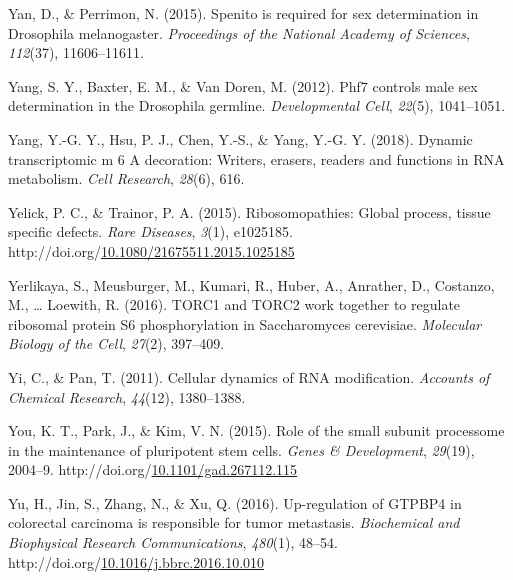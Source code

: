 \documentclass[12pt,oneside]{reedthesis}
\newlength{\cslhangindent}
\newenvironment{CSLReferences}[2] %
 {%
  \setlength{\parindent}{0pt}
  \ifodd #1 \everypar{\setlength{\hangindent}{\cslhangindent}}\ignorespaces\fi
  \ifnum #2 > 0
  \setlength{\parskip}{#2\baselineskip}
  \fi
 }%
 {}
\begin{document}
\begin{CSLReferences}{1}{0}
\leavevmode{}%
Yan, D., \& Perrimon, N. (2015). Spenito is required for sex determination in {Drosophila} melanogaster. \emph{Proceedings of the National Academy of Sciences}, \emph{112}(37), 11606--11611.

\leavevmode{}%
Yang, S. Y., Baxter, E. M., \& Van Doren, M. (2012). Phf7 controls male sex determination in the {Drosophila} germline. \emph{Developmental Cell}, \emph{22}(5), 1041--1051.

\leavevmode{}%
Yang, Y.-G. Y., Hsu, P. J., Chen, Y.-S., \& Yang, Y.-G. Y. (2018). Dynamic transcriptomic m 6 {A} decoration: Writers, erasers, readers and functions in {RNA} metabolism. \emph{Cell Research}, \emph{28}(6), 616.

\leavevmode{}%
Yelick, P. C., \& Trainor, P. A. (2015). Ribosomopathies: {Global} process, tissue specific defects. \emph{Rare Diseases}, \emph{3}(1), e1025185. http://doi.org/\href{https://doi.org/10.1080/21675511.2015.1025185}{10.1080/21675511.2015.1025185}

\leavevmode{}%
Yerlikaya, S., Meusburger, M., Kumari, R., Huber, A., Anrather, D., Costanzo, M., \ldots{} Loewith, R. (2016). {TORC1} and {TORC2} work together to regulate ribosomal protein {S6} phosphorylation in {Saccharomyces} cerevisiae. \emph{Molecular Biology of the Cell}, \emph{27}(2), 397--409.

\leavevmode{}%
Yi, C., \& Pan, T. (2011). Cellular dynamics of {RNA} modification. \emph{Accounts of Chemical Research}, \emph{44}(12), 1380--1388.

\leavevmode{}%
You, K. T., Park, J., \& Kim, V. N. (2015). Role of the small subunit processome in the maintenance of pluripotent stem cells. \emph{Genes \& Development}, \emph{29}(19), 2004--9. http://doi.org/\href{https://doi.org/10.1101/gad.267112.115}{10.1101/gad.267112.115}

\leavevmode{}%
Yu, H., Jin, S., Zhang, N., \& Xu, Q. (2016). Up-regulation of {GTPBP4} in colorectal carcinoma is responsible for tumor metastasis. \emph{Biochemical and Biophysical Research Communications}, \emph{480}(1), 48--54. http://doi.org/\href{https://doi.org/10.1016/j.bbrc.2016.10.010}{10.1016/j.bbrc.2016.10.010}


\end{CSLReferences}
\end{document}
